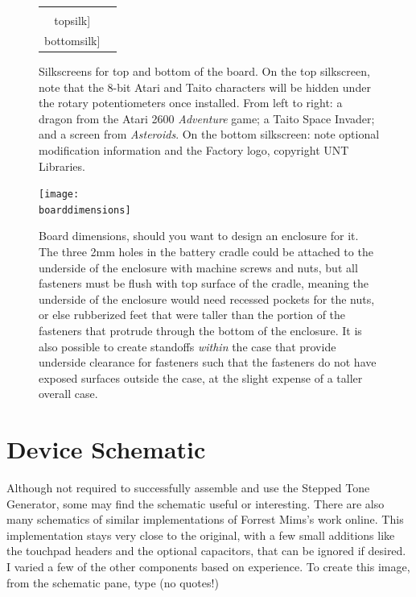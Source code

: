 \documentclass[12pt]{article}
\newcommand{\+}{\item}		%
\newcommand{\bottomsilk}{bottomsilk.png}
\newcommand{\topsilk}{topsilk.png}
\newcommand{\boarddimensions}{dimensions.png}
\begin{document}
\newpage

\begin{figure}
\begin{center}
\begin{tabular}{cc}

\texttt{[image: \\topsilk]}

&

\texttt{[image: \\bottomsilk]}

\\

\end{tabular}

\end{center}
\caption{Silkscreens for top and bottom of the board. On the top silkscreen, note that the 8-bit Atari and Taito characters will be hidden under the rotary potentiometers once installed. From left to right: a dragon from the Atari 2600 \emph{Adventure} game; a Taito Space Invader; and a screen from \emph{Asteroids}. On the bottom silkscreen: note optional modification information and the Factory logo, copyright UNT Libraries.}
\end{figure}

\begin{figure}
\begin{center}
\texttt{[image: \\boarddimensions]}
\end{center}
\caption{Board dimensions, should you want to design an enclosure for it. The three 2mm holes in the battery cradle could be attached to the underside of the enclosure with machine screws and nuts, but all fasteners must be flush with top surface of the cradle, meaning the underside of the enclosure would need recessed pockets for the nuts, or else rubberized feet that were taller than the portion of the fasteners that protrude through the bottom of the enclosure. It is also possible to create standoffs \emph{within} the case that provide underside clearance for fasteners such that the fasteners do not have exposed surfaces outside the case, at the slight expense of a taller overall case.}
\end{figure}




\clearpage 
\section{Device Schematic}

Although not required to successfully assemble and use the Stepped Tone Generator, some may find the schematic useful or interesting. There are also many schematics of similar implementations of Forrest Mims's work online. This implementation stays very close to the original, with a few small additions like the touchpad headers and the optional capacitors, that can be ignored if desired. I varied a few of the other components based on experience. To create this image, from the schematic pane, type (no quotes!)
\end{document}
